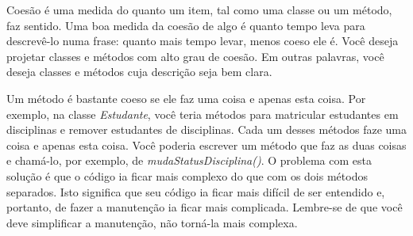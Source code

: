 Coesão é uma medida do quanto um item, tal como uma classe ou um método, faz sentido. Uma boa medida da coesão de algo é quanto tempo leva para descrevê-lo numa frase: quanto mais tempo levar, menos coeso ele é. Você deseja projetar classes e métodos com alto grau de coesão. Em outras palavras, você deseja classes e métodos cuja descrição seja bem clara.

Um método é bastante coeso se ele faz uma coisa e apenas esta coisa. Por exemplo, na classe \emph{Estudante}, você teria métodos para matricular estudantes em disciplinas e remover estudantes de disciplinas. Cada um desses métodos faze uma coisa e apenas esta coisa. Você poderia escrever um método que faz as duas coisas e chamá-lo, por exemplo, de \emph{mudaStatusDisciplina()}. O problema com esta solução é que o código ia ficar mais complexo do que com os dois métodos separados. Isto significa que seu código ia ficar mais difícil de ser entendido e, portanto, de fazer a manutenção ia ficar mais complicada. Lembre-se de que você deve simplificar a manutenção, não torná-la mais complexa.

\noindent {}

